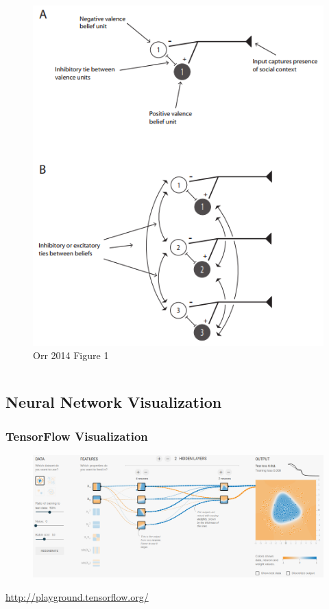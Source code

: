 \documentclass[compress]{beamer}
\begin{document}
\begin{frame}[Basic2]
\begin{columns}
\begin{column}{0.5\linewidth}
\begin{figure}
                    \includegraphics[width=0.7\linewidth]{../figures/orr_nn}
                    \caption{Orr 2014 Figure 1}
                    \label{fig:orrnn}
                    \end{figure}
            \end{column}
        \end{columns}
    \end{frame}

\subsection{Neural Network Visualization}

    \begin{frame}[Basic2]\frametitle{TensorFlow Visualization}
        
        \vspace{7mm}
        
        \begin{figure}
            \centering
            \includegraphics[width=0.9\linewidth]{../figures/tensorflow_visualization}
            \caption{}
            \label{fig:tensorflowvisualization}
        \end{figure}

        
        \url{http://playground.tensorflow.org/}
    \end{frame}
\end{document}
